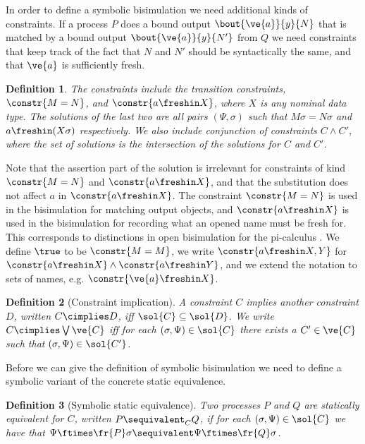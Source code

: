 \documentclass{eptcs}
\newtheorem{definition}{Definition}
\theoremstyle{definition}
\begin{document}
In order to define a symbolic bisimulation we need additional kinds of
constraints. If a process $P$ does a bound output
$\bout{\ve{a}}{y}{N}$ that is matched by a bound output $\bout{\ve{a}}{y}{N'}$
from $Q$ we need constraints that keep track of the fact that $N$ and $N'$
should be syntactically the same, and that $\ve{a}$ is sufficiently fresh.
\begin{definition}
The {\em constraints} include the transition constraints, 
 $\constr{M=N}$, and
$\constr{a \freshin X}$, where $X$ is any nominal data type. The solutions of
the last two are all pairs $(\Psi, \sigma)$ such that $M\sigma = N\sigma$
and $a \freshin (X\sigma)$ respectively. We also include conjunction of
constraints $C \wedge C'$, where the set of solutions is the
intersection of the
solutions for $C$ and $C'$.
\end{definition}
Note that the assertion part of the solution is irrelevant for constraints of kind $\constr{M=N}$ and
$\constr{a \freshin X}$, and that the substitution does not affect $a$ in $\constr{ a \freshin X}$.
The constraint $\constr{M=N}$ is
used in the bisimulation for matching output objects, and $\constr{a \freshin
X}$ is
used in the bisimulation for recording what an opened name must be fresh for.
This corresponds to distinctions in open bisimulation for the pi-calculus
\cite{sangiorgi:theory-bisimulation}.
We define $\true$ to be $\constr{M=M}$, we write $\constr{a \freshin X,Y}$ for
$\constr{a \freshin X}
\wedge \constr{a \freshin Y}$, and we extend the notation to sets of names, e.g.
$\constr{\ve{a}
\freshin X}$.


\begin{definition}[Constraint implication]
 A constraint $C$ \emph{implies} another constraint $D$, written $C \cimplies
D$, iff $\sol{C} \subseteq \sol{D}$.
We write $C \cimplies \bigvee \ve{C}$ iff
 for
each $(\sigma,\Psi) \in \sol{C}$ there exists a $C' \in \ve{C}$ such that $(\sigma,\Psi) \in
\sol{C'}$.
\end{definition}

Before we can give the definition of symbolic
bisimulation we need to define a symbolic variant of  the concrete static equivalence.

\begin{definition}[Symbolic static equivalence]
 \label{def:ssequivalent}
 Two processes $P$ and $Q$ are \emph{statically equivalent} for $C$, written
$P \sequivalent_C Q$, if for each $(\sigma,\Psi) \in \sol{C}$
we have that $\Psi \ftimes \fr{P}\sigma \sequivalent \Psi \ftimes
\fr{Q}\sigma$.
\end{definition}
\end{document}
